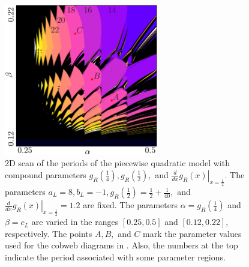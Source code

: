 \begin{figure}
	\centering
	\includegraphics[width=0.6\textwidth]{../Figures/5/5.9/result.png}
	\caption[2D scan of the periods of the quadratic model with compound parameters]{
	2D scan of the periods of the piecewise quadratic model with compound parameters $g_R\left(\frac{1}{4}\right), g_R\left(\frac{1}{2}\right),$ and $\left. \frac{d}{dx} g_R\left(x\right) \right|_{x = \frac{1}{2}}$.
	The parameters $a_L = 8, b_L = -1, g_R\left(\frac{1}{2}\right) = \frac{1}{2} + \frac{1}{40},$ and $\left. \frac{d}{dx} g_R\left(x\right) \right|_{x = \frac{1}{2}} = 1.2$ are fixed.
	The parameters $\alpha = g_R\left(\frac{1}{4}\right)$ and $\beta = c_L$ are varied in the ranges $[0.25, 0.5]$ and $[0.12, 0.22]$, respectively.
	The points $A, B,$ and $C$ mark the parameter values used for the cobweb diagrams in .
	Also, the numbers at the top indicate the period associated with some parameter regions.
	}
	\label{fig:setup.quad.hyper.1.period}
\end{figure}

